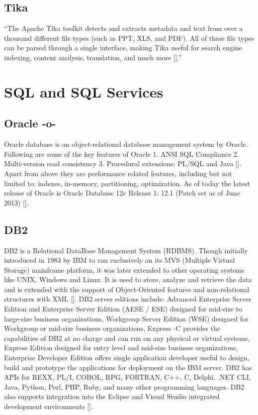      
\subsection{Tika}

``The Apache Tika toolkit detects and extracts metadata and text from
over a thousand different file types (such as PPT, XLS, and PDF). All
of these file types can be parsed through a single interface, making
Tika useful for search engine indexing, content analysis, translation,
and much more [\cite{www-tika}].''


\section{SQL and SQL Services}

\subsection{Oracle -o-}

Oracle database is an object-relational database management system by
Oracle. Following are some of the key features of Oracle 1. ANSI SQL
Compliance 2. Multi-version read consistency 3. Procedural extensions:
PL/SQL and Java [\cite{www-oracle}].  Apart from above they are
performance related features, including but not limited to: indexes,
in-memory, partitioning, optimization.  As of today the latest release
of Oracle is Oracle Database 12c Release 1: 12.1 (Patch set as of June
2013) [\cite{www-oracle}].




\subsection{DB2}

DB2 is a Relational DataBase Management System (RDBMS). Though
initially introduced in 1983 by IBM to run exclusively on its MVS
(Multiple Virtual Storage) mainframe platform, it was later extended
to other operating systems like UNIX, Windows and Linux. It is used to
store, analyze and retrieve the data and is extended with the support
of Object-Oriented features and non-relational structures with
XML [\cite{www-DB2Intro}]. DB2 server editions include: Advanced
Enterprise Server Edition and Enterprise Server Edition (AESE / ESE)
designed for mid-size to large-size business organizations, Workgroup
Server Edition (WSE) designed for Workgroup or mid-size business
organizations, Express -C provides the capabilities of DB2 at no
charge and can run on any physical or virtual systems, Express Edition
designed for entry level and mid-size business organizations,
Enterprise Developer Edition offers single application developer
useful to design, build and prototype the applications for deployment
on the IBM server. DB2 has APIs for REXX, PL/I, COBOL, RPG, FORTRAN,
C++, C, Delphi, .NET CLI, Java, Python, Perl, PHP, Ruby, and many
other programming languages. DB2 also supports integration into the
Eclipse and Visual Studio integrated development
environments [\cite{www-DB2Wiki}].

